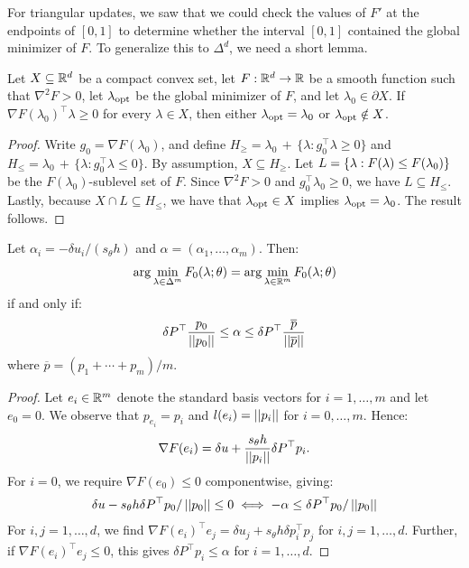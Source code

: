 \documentclass[eikonal.tex]{subfiles}
\begin{document}
For triangular updates, we saw that we could check the values of $F'$
at the endpoints of $[0, 1]$ to determine whether the interval
$[0, 1]$ contained the global minimizer of $F$. To generalize this to
$\Delta^d$, we need a short lemma.

\begin{lemma}
  Let $X \subseteq \mathbb{R}^d$ be a compact convex set, let
  $F : \mathbb{R}^d \to \mathbb{R}$ be a smooth function such that $\nabla^2 F > 0$,
  let $\lambda_{\operatorname{opt}}$ be the global minimizer of $F$, and let
  $\lambda_0 \in \partial X$. If
  $\nabla F(\lambda_0)^\top \lambda \geq 0$ for every $\lambda \in X$,
  then either $\lambda_{\operatorname{opt}} = \lambda_0$ or $\lambda_{\operatorname{opt}} \notin X$.
\end{lemma}

\begin{proof}
  Write $g_0 = \nabla F(\lambda_0)$, and define
  $H_{\geq} = \lambda_0 \,+\, \{\lambda: g_0^\top \lambda \geq 0\}$
  and
  $H_{\leq} = \lambda_0 \,+\, \{\lambda: g_0^\top \lambda \leq 0\}$.
  By assumption, $X \subseteq H_{\geq}$. Let
  $L = \left\{\lambda : F(\lambda) \leq F(\lambda_0)\right\}$ be the
  $F(\lambda_0)$-sublevel set of $F$. Since $\nabla^2 F > 0$ and
  $g_0^\top \lambda_0 \geq 0$, we have $L \subseteq H_{\leq}$. Lastly,
  because $X \cap L \subseteq H_{\leq}$, we have that
  $\lambda_{\operatorname{opt}} \in X$ implies $\lambda_{\operatorname{opt}} = \lambda_0$. The result
  follows.
\end{proof}

\begin{theorem}
  Let $\alpha_i = -\delta u_i/(s_{\theta}h)$ and
  $\alpha = (\alpha_1, \hdots, \alpha_m)$. Then:
  \begin{align*}
    \arg\min_{\lambda \in \Delta^m} F_0(\lambda; \theta) = \arg\min_{\lambda \in \mathbb{R}^m} F_0(\lambda; \theta)
  \end{align*}
  if and only if:
  \begin{align*}
    \delta P^\top \frac{p_0}{\left|\left|p_0\right|\right|} \leq \alpha \leq \delta P^\top \frac{\overline{p}}{\left|\left|\overline{p}\right|\right|}
  \end{align*}
  where $\overline{p} = (p_1 + \cdots + p_m)/m$.
\end{theorem}

\begin{proof}
  Let $e_i \in \mathbb{R}^m$ denote the standard basis vectors for
  $i = 1, \hdots, m$ and let $e_0 = 0$. We observe that
  $p_{e_i} = p_i$ and $l(e_i) = \left|\left|p_i\right|\right|$ for $i = 0, \hdots,
  m$. Hence:
  \begin{align*}
    \nabla F(e_i) = \delta u + \frac{s_\theta h}{\left|\left|p_i\right|\right|} \delta P^\top p_i.
  \end{align*}
  For $i = 0$, we require $\nabla F(e_0) \leq 0$ componentwise, giving:
  \begin{align*}
    \delta u - s_\theta h \delta P^\top p_0/\left|\left|p_0\right|\right| \leq 0  \iff -\alpha \leq \delta P^\top p_0/\left|\left|p_0\right|\right|
  \end{align*}
  For $i, j = 1, \hdots, d$, we find
  $\nabla F(e_i)^\top e_j = \delta u_j + s_\theta h \delta p_i^\top
  p_j$ for $i, j = 1, \hdots, d$. Further, if
  $\nabla F(e_i)^\top e_j \leq 0$, this gives
  $\delta P^\top p_i \leq \alpha$ for $i = 1, \hdots, d$.
\end{proof}
\end{document}
